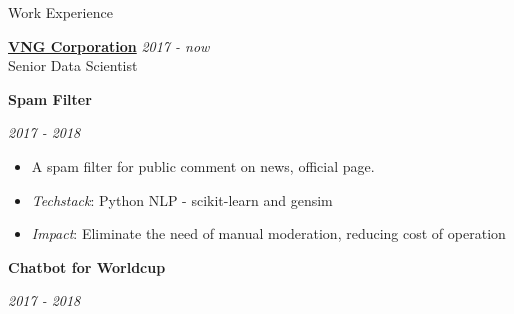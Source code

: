 \documentclass{resume} %
\begin{document}
\begin{rSection}{Work Experience}

{\bf \underline{VNG Corporation}} \hfill {\em 2017 - now}
\\Senior Data Scientist

\textbf{Spam Filter} \hfill {\em \textit{2017 - 2018}

\begin{itemize}
    \item A spam filter for public comment on news, official page.
    \item \textit{Techstack}: Python NLP - scikit-learn and gensim
    \item \textit{Impact}: Eliminate the need of manual moderation, reducing cost of operation
\end{itemize}




\textbf{Chatbot for Worldcup} \hfill {\em \textit{2017 - 2018}

}}
\end{rSection}
\end{document}
